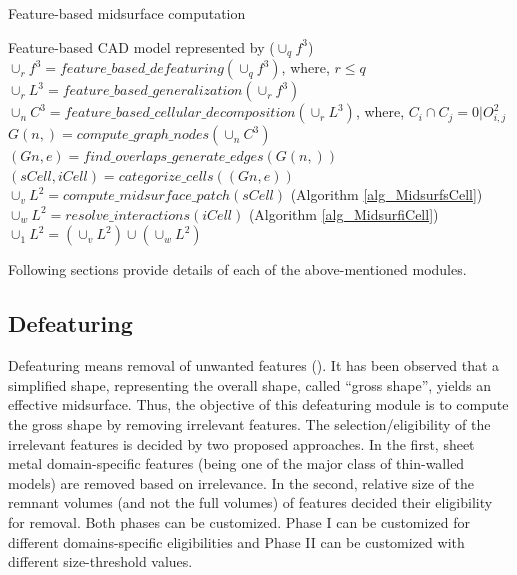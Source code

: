 \begin{algorithm}[!h]
\caption{Feature-based midsurface computation}
\label{alg_FBDMidsurf}
\begin{algorithmic}
	\REQUIRE Feature-based CAD model  represented by  ($\cup_qf^3$)
	\STATE $\cup_rf^3 = feature\_based\_defeaturing(\cup_qf^3)$, where, $r \leq q$
	\STATE $\cup_rL^3 = feature\_based\_generalization(\cup_rf^3 )$
	\STATE $\cup_nC^3 =feature\_based\_cellular\_decomposition(\cup_rL^3)$, where, $C_i \cap C_j = 0| O_{i,j}^2$
	\STATE $G(n, ) = compute\_graph\_nodes(\cup_nC^3)$
	\STATE $(Gn,e) = find\_overlaps\_generate\_edges(G(n, ))$
	\STATE $(sCell,iCell) = categorize\_cells((Gn,e))$
		\STATE $\cup_vL^2 = compute\_midsurface\_patch(sCell)$ (Algorithm \ref{alg_MidsurfsCell})
	\ENDFOR
		\STATE $\cup_wL^2 = resolve\_interactions(iCell)$ (Algorithm \ref{alg_MidsurfiCell})
	\ENDFOR
	\RETURN $\cup_1L^2 = (\cup_vL^2) \cup (\cup_wL^2)$

\end{algorithmic}
\end{algorithm}

\bigskip

Following sections provide details of each of the above-mentioned modules.

\subsection{Defeaturing} \label{sec:defeaturing}
Defeaturing means removal of unwanted features (\cite{Thakur2009}). It has been observed that a simplified shape, representing the overall shape, called ``gross shape'', yields an effective midsurface. Thus, the objective of this defeaturing module is to compute the gross shape by removing irrelevant features. The selection/eligibility of the irrelevant features is decided by two proposed approaches. In the first, sheet metal domain-specific features (being one of the major class of thin-walled models) are removed based on irrelevance. In the second, relative size of the remnant volumes (and not the full volumes) of features decided their eligibility for removal. Both phases can be customized. Phase I can be customized for different domains-specific eligibilities and Phase II can be customized with different size-threshold values. %

